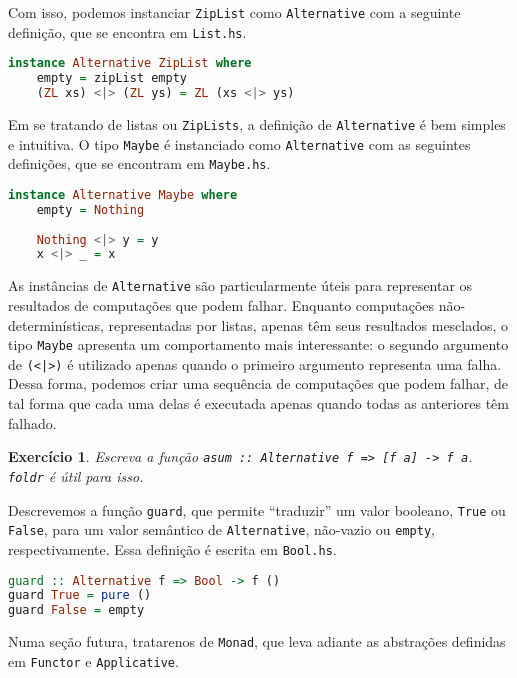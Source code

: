 \documentclass[a4paper]{article}
\newtheorem{exercicio}{Exercício}
\begin{document}
Com isso, podemos instanciar \texttt{ZipList} como \texttt{Alternative} com a seguinte definição, que se encontra em \texttt{List.hs}.

\begin{lstlisting}[language=haskell, frame=single]
instance Alternative ZipList where
	empty = zipList empty
	(ZL xs) <|> (ZL ys) = ZL (xs <|> ys)
\end{lstlisting}

Em se tratando de listas ou \texttt{ZipLists}, a definição de \texttt{Alternative} é bem simples e intuitiva.
O tipo \texttt{Maybe} é instanciado como \texttt{Alternative} com as seguintes definições, que se encontram em \texttt{Maybe.hs}.

\begin{lstlisting}[language=haskell, frame=single]
instance Alternative Maybe where
	empty = Nothing
	
	Nothing <|> y = y
	x <|> _ = x
\end{lstlisting}

As instâncias de \texttt{Alternative} são particularmente úteis para representar os resultados de computações que podem falhar.
Enquanto computações não-determinísticas, representadas por listas, apenas têm seus resultados mesclados, o tipo \texttt{Maybe} apresenta um comportamento mais interessante:
o segundo argumento de \texttt{(<|>)} é utilizado apenas quando o primeiro argumento representa uma falha.
Dessa forma, podemos criar uma sequência de computações que podem falhar, de tal forma que cada uma delas é executada apenas quando todas as anteriores têm falhado.

\begin{exercicio}
	Escreva a função \emph{\texttt{asum :: Alternative f => [f a] -> f a}}.
	\emph{\texttt{foldr}} é útil para isso.
\end{exercicio}

Descrevemos a função \texttt{guard}, que permite ``traduzir'' um valor booleano, \texttt{True} ou \texttt{False}, para um valor semântico de \texttt{Alternative}, não-vazio ou \texttt{empty}, respectivamente.
Essa definição é escrita em \texttt{Bool.hs}.

\begin{lstlisting}[language=haskell, frame=single]
guard :: Alternative f => Bool -> f ()
guard True = pure ()
guard False = empty
\end{lstlisting}

Numa seção futura, tratarenos de \texttt{Monad}, que leva adiante as abstrações definidas em \texttt{Functor} e \texttt{Applicative}.
\end{document}
